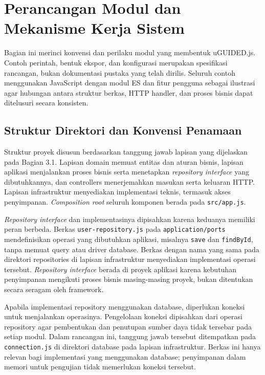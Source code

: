 \documentclass[12pt,a4paper,oneside]{report}
\begin{document}
\clearpage
\section{Perancangan Modul dan Mekanisme Kerja Sistem}
\label{sec:perancangan_modul}
Bagian ini merinci konvensi dan perilaku modul yang membentuk uGUIDED.js. Contoh perintah, bentuk ekspor, dan konfigurasi merupakan spesifikasi rancangan, bukan dokumentasi pustaka yang telah dirilis. Seluruh contoh menggunakan JavaScript dengan modul ES dan fitur pengguna sebagai ilustrasi agar hubungan antara struktur berkas, HTTP handler, dan proses bisnis dapat ditelusuri secara konsisten.

\subsection{Struktur Direktori dan Konvensi Penamaan}
Struktur proyek disusun berdasarkan tanggung jawab lapisan yang dijelaskan pada Bagian 3.1. Lapisan domain memuat entitas dan aturan bisnis, lapisan aplikasi menjalankan proses bisnis serta menetapkan \textit{repository interface} yang dibutuhkannya, dan controllers menerjemahkan masukan serta keluaran HTTP. Lapisan infrastruktur menyediakan implementasi teknis, termasuk akses penyimpanan. \textit{Composition root} seluruh komponen berada pada \texttt{src/\allowbreak app.js}.

\textit{Repository interface} dan implementasinya dipisahkan karena keduanya memiliki peran berbeda. Berkas \texttt{user-repository.js} pada \texttt{application/\allowbreak ports} mendefinisikan operasi yang dibutuhkan aplikasi, misalnya \texttt{save} dan \texttt{findById}, tanpa memuat query atau driver database. Berkas dengan nama yang sama pada direktori repositories di lapisan infrastruktur menyediakan implementasi operasi tersebut. \textit{Repository interface} berada di proyek aplikasi karena kebutuhan penyimpanan mengikuti proses bisnis masing-masing proyek, bukan ditentukan secara seragam oleh framework.

Apabila implementasi repository menggunakan database, diperlukan koneksi untuk menjalankan operasinya. Pengelolaan koneksi dipisahkan dari operasi repository agar pembentukan dan penutupan sumber daya tidak tersebar pada setiap modul. Dalam rancangan ini, tanggung jawab tersebut ditempatkan pada \texttt{connection.js} di direktori database pada lapisan infrastruktur. Berkas ini hanya relevan bagi implementasi yang menggunakan database; penyimpanan dalam memori untuk pengujian tidak memerlukan koneksi tersebut.
\end{document}

